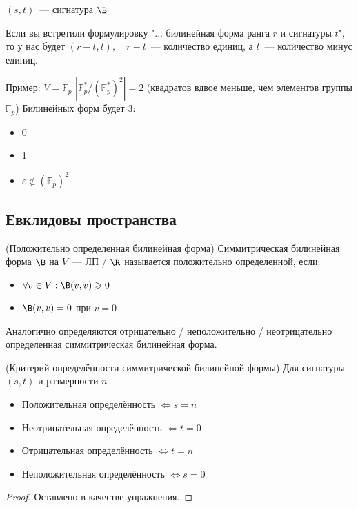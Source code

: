 \begin{conj}
    $(s, t)$~--- сигнатура $\B$
\end{conj}

\notice Если вы встретили формулировку "... билинейная форма ранга $r$ и сигнатуры $t$", то у нас будет $(r - t, t), \quad r - t$~--- количество единиц, а $t$~--- количество минус единиц.

\underline{Пример:}
$V = \mathbb{F}_p$
$|\mathbb{F}^*_p / (\mathbb{F}^*_p)^2| = 2$ (квадратов вдвое меньше, чем элементов группы $\mathbb{F}_p$)
Билинейных форм будет $3$:
\begin{itemize}
    \item 0
    \item 1
    \item $\varepsilon \not \in (\mathbb{F}_p)^2$
\end{itemize}

\subsection*{Евклидовы пространства}

\begin{conj}(Положительно определенная билинейная форма)
    Симмитрическая билинейная форма $\B$ на $V$~--- ЛП / $\R$ называется положительно определенной, если:
    \begin{itemize}
        \item $\forall v \in V: \B(v, v) \geqslant 0$
        \item $\B(v, v) = 0$ при $v = 0$
    \end{itemize}
\end{conj}
\notice Аналогично определяются отрицательно / неположительно / неотрицательно определенная симмитрическая билинейная форма.

\begin{theorem}(Критерий определённости симмитрической билинейной формы)
    Для сигнатуры $(s, t)$ и размерности $n$
    \begin{itemize}
        \item Положительная определённость $\Longleftrightarrow s = n$
        \item Неотрицательная определённость $\Longleftrightarrow t = 0$
        \item Отрицательная определённость $\Longleftrightarrow t = n$
        \item Неположительная определённость $\Longleftrightarrow s = 0$
    \end{itemize}
    \begin{proof}
    \emptyln
    Оставлено в качестве упражнения.
    \end{proof}
\end{theorem}


